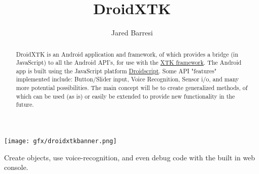 \documentclass[sigconf]{acmart}
\begin{document}
\title{DroidXTK}

\author{Jared Barresi}


\renewcommand{\shortauthors}{}

\begin{abstract}
 DroidXTK is an Android application and framework, of which provides a bridge (in JavaScript) to all the Android API's, for use with the \textcolor{blue}{\hyperlink{http://www.goxtk.com}{XTK framework}}. The Android app is built using the JavaScript platform \textcolor{blue}{\hyperlink{http://www.androidscript.org}{Droidscript}}. Some API "features" implemented include: Button/Slider input, Voice Recognition, Sensor i/o, and many more potential possibilities. The main concept will be to create generalized methods, of which can be used (as is) or easily be extended to provide new functionality in the future.
\end{abstract}


\begin{teaserfigure}
  \texttt{[image: gfx/droidxtkbanner.png]}
  \caption{Create objects, use voice-recognition, and even debug code with the built in web console.  }
  \label{fig:teaser}
\end{teaserfigure}
\end{document}
